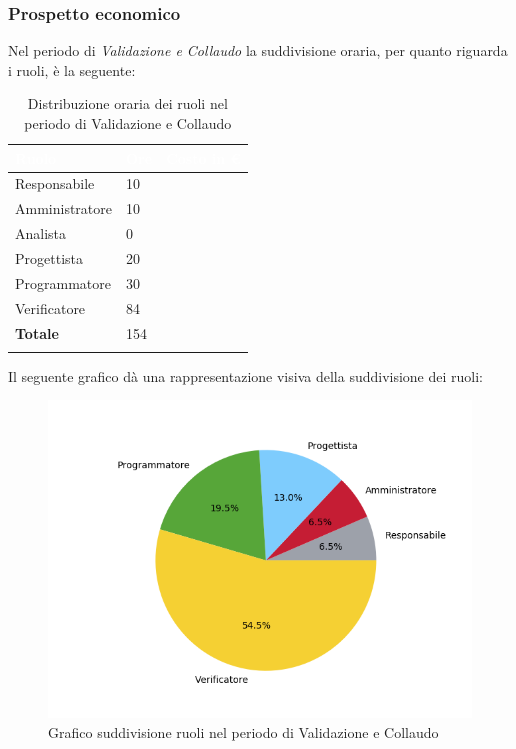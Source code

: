 \subsubsection{Prospetto economico}
Nel periodo di \textit{Validazione e Collaudo} la suddivisione oraria, per quanto riguarda i ruoli, è la seguente: 


\begin{longtable}{| C{.30\textwidth}| C{.15\textwidth}| C{.20\textwidth}|}
	\hline
	\textbf{\textcolor{white}{Ruolo}} & \textbf{\textcolor{white}{Ore}} & \textbf{\textcolor{white}{Costo in \euro}} \\
	\hline 
	Responsabile & 10 &  \\
	\hline
	Amministratore & 10 & \\
	\hline
	Analista & 0 &  \\
	\hline
	Progettista & 20 &  \\
	\hline
	Programmatore & 30 &  \\
	\hline
	Verificatore & 84 &  \\
	\hline
	\textbf{Totale} & 154 & \\ 
	\hline
	
	\caption{Distribuzione oraria dei ruoli nel periodo di Validazione e Collaudo}
	\label{Distribuzione oraria del periodo di Validazione e collaudo}
\end{longtable}

Il seguente grafico dà una rappresentazione visiva della suddivisione dei ruoli:
\begin{figure}[H]
	\centering
	\includegraphics[width=1\linewidth]{./images/torta_vc.png}
	\caption{Grafico suddivisione ruoli nel periodo di Validazione e Collaudo}
	\label{fig:grafico suddivione ruoli periodo di Validazione e collaudo}
\end{figure}

